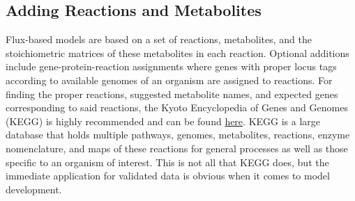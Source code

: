 \subsection{Adding Reactions and Metabolites}
Flux-based models are based on a set of reactions, metabolites, and the stoichiometric matrices of these metabolites in each reaction. Optional additions include gene-protein-reaction assignments where genes with proper locus tags according to available genomes of an organism are assigned to reactions. For finding the proper reactions, suggested metabolite names, and expected genes corresponding to said reactions, the Kyoto Encyclopedia of Genes and Genomes (KEGG) is highly recommended and can be found \href{https://www.kegg.jp/}{here}. KEGG is a large database that holds multiple pathways, genomes, metabolites, reactions, enzyme nomenclature, and maps of these reactions for general processes as well as those specific to an organism of interest. This is not all that KEGG does, but the immediate application for validated data is obvious when it comes to model development.
